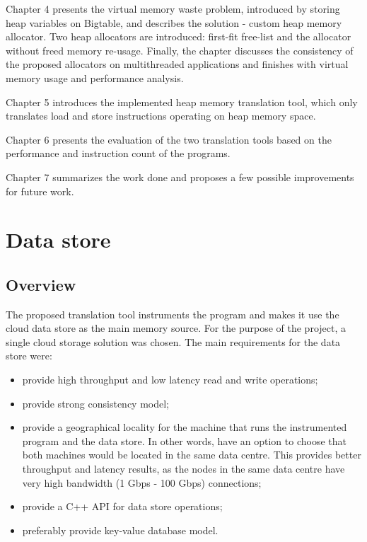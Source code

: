 \documentclass[bsc,frontabs,twoside,singlespacing,parskip,deptreport]{infthesis}     %
\begin{document}
Chapter 4 presents the virtual memory waste problem, introduced by storing heap variables on Bigtable, and describes the solution - custom heap memory allocator. Two heap allocators are introduced: first-fit free-list and the allocator without freed memory re-usage. Finally, the chapter discusses the consistency of the proposed allocators on multithreaded applications and finishes with virtual memory usage and performance analysis.

Chapter 5 introduces the implemented heap memory translation tool, which only translates load and store instructions operating on heap memory space.

Chapter 6 presents the evaluation of the two translation tools based on the performance and instruction count of the programs.

Chapter 7 summarizes the work done and proposes a few possible improvements for future work.

\chapter{Data store}

\section{Overview}

The proposed translation tool instruments the program and makes it use the cloud data store as the main memory source. For the purpose of the project, a single cloud storage solution was chosen.
The main requirements for the data store were:

\begin{itemize}
\item
provide high throughput and low latency read and write operations;
\item
provide strong consistency model;
\item
provide a geographical locality for the machine that runs the instrumented program and the data store. In other words, have an option to choose that both machines would be located in the same data centre. This provides better throughput and latency results, as the nodes in the same data centre have very high bandwidth (1 Gbps - 100 Gbps) connections;
\item
provide a C++ API for data store operations;
\item
preferably provide key-value database model.
\end{itemize}
\end{document}
